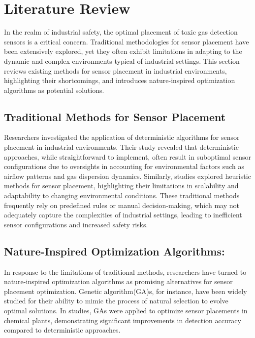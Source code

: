 \documentclass[conference]{IEEEtran}
\begin{document}
\section{Literature Review}\label{sec2}
In the realm of industrial safety, the optimal placement of toxic gas detection sensors is a critical concern. Traditional methodologies for sensor placement have been extensively explored, yet they often exhibit limitations in adapting to the dynamic and complex environments typical of industrial settings. This section reviews existing methods for sensor placement in industrial environments, highlighting their shortcomings, and introduces nature-inspired optimization algorithms as potential solutions.

\subsection{Traditional Methods for Sensor Placement}
Researchers investigated the application of deterministic algorithms for sensor placement in industrial environments. Their study revealed that deterministic approaches, while straightforward to implement, often result in suboptimal sensor configurations due to oversights in accounting for environmental factors such as airflow patterns and gas dispersion dynamics. Similarly, studies explored heuristic methods for sensor placement, highlighting their limitations in scalability and adaptability to changing environmental conditions. These traditional methods frequently rely on predefined rules or manual decision-making, which may not adequately capture the complexities of industrial settings, leading to inefficient sensor configurations and increased safety risks\cite{loh2023efficient, naouri2023efficient}.

\subsection{Nature-Inspired Optimization Algorithms:}
In response to the limitations of traditional methods, researchers have turned to nature-inspired optimization algorithms as promising alternatives for sensor placement optimization. Genetic algorithm(GA)s, for instance, have been widely studied for their ability to mimic the process of natural selection to evolve optimal solutions\cite{boatwright2023integrated}. In studies, GAs were applied to optimize sensor placements in chemical plants, demonstrating significant improvements in detection accuracy compared to deterministic approaches\cite{shiddiqi2024ga}.
\end{document}
